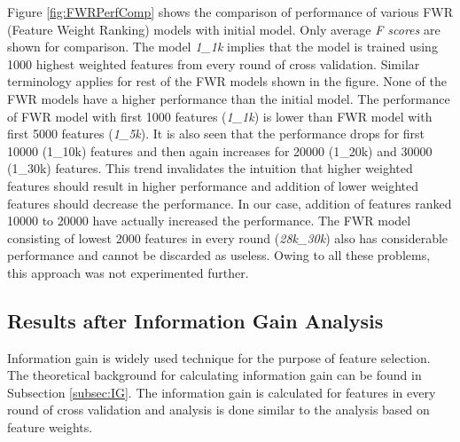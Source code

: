 Figure \ref{fig:FWRPerfComp} shows the comparison of performance of various FWR (Feature Weight Ranking) models with initial model. Only average \textit{F scores} are shown for comparison. The model \textit{1\_1k} implies that the model is trained using 1000 highest weighted features from every round of cross validation. Similar terminology applies for rest of the FWR models shown in the figure. None of the FWR models have a higher performance than the initial model. The performance of FWR model with first 1000 features (\textit{1\_1k}) is lower than FWR model with first 5000 features (\textit{1\_5k}). It is also seen that the performance drops for first 10000 (1\_10k) features and then again increases for 20000 (1\_20k) and 30000 (1\_30k) features. This trend invalidates the intuition that higher weighted features should result in higher performance and addition of lower weighted features should decrease the performance. In our case, addition of features ranked 10000 to 20000 have actually increased the performance. The FWR model consisting of lowest 2000 features in every round (\textit{28k\_30k}) also has considerable performance and cannot be discarded as useless. Owing to all these problems, this approach was not experimented further.

\subsection{Results after Information Gain Analysis}\label{subsec:SS_IG}

Information gain is widely used technique for the purpose of feature selection. The theoretical background for calculating information gain can be found in Subsection \ref{subsec:IG}. The information gain is calculated for features in every round of cross validation and analysis is done similar to the analysis based on feature weights.

